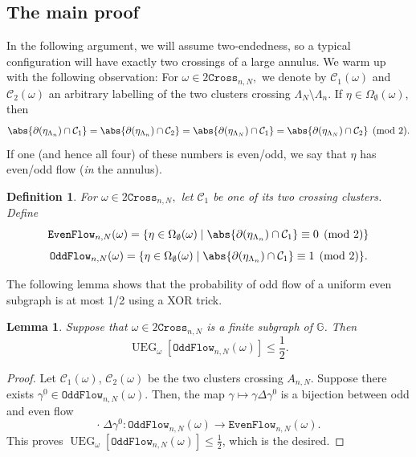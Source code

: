 \documentclass[article,11pt,reqno]{amsart}
\newtheorem{definition}[theorem]{Definition}
\newtheorem{lemma}[theorem]{Lemma}
\begin{document}
\subsection{The main proof}



In the following argument, we will assume two-endedness, so a typical configuration will have exactly two crossings of a large annulus. We warm up with the following observation: For $\omega\in 2\mathtt{Cross}_{n,N},$ we denote by $\mathcal{C}_1(\omega)$ and $\mathcal{C}_2(\omega)$ an arbitrary labelling of the two clusters crossing $\Lambda_N\setminus \Lambda_n.$ If
$\eta \in \Omega_{\emptyset}(\omega)$, then
\begin{align} \label{eq:parity}
    \abs{\partial (\eta_{\Lambda_n})\cap \mathcal{C}_1}=    \abs{\partial (\eta_{\Lambda_n})\cap \mathcal{C}_2}
    =    \abs{\partial (\eta_{\Lambda_N})\cap \mathcal{C}_1}
    =    \abs{\partial (\eta_{\Lambda_N})\cap \mathcal{C}_2} \pmod 2.
\end{align}
If one (and hence all four) of these numbers is even/odd, we say that $\eta$ has even/odd flow (\textit{in} the annulus). 
\begin{definition}
    For $\omega\in 2\mathtt{Cross}_{n,N},$  let $\mathcal{C}_1$ be one of its two crossing clusters. Define 
    $$\mathtt{EvenFlow}_{n,N}(\omega) = \{ \eta \in \Omega_\emptyset(\omega) \mid \abs{\partial (\eta_{\Lambda_n})\cap \mathcal{C}_1} \equiv 0 \pmod{2}  \}$$
     $$\mathtt{OddFlow}_{n,N}(\omega) = \{ \eta \in \Omega_\emptyset(\omega) \mid \abs{\partial (\eta_{\Lambda_n})\cap \mathcal{C}_1} \equiv 1 \pmod{2}  \}.$$
\end{definition}
The following lemma shows that the probability of odd flow of a uniform even subgraph is at most 1/2 using a XOR trick.
\begin{lemma} \label{lemma:source_counting}
    Suppose that $\omega \in 2\mathtt{Cross}_{n,N}$ is a finite subgraph of $\mathbb{G}$.
    Then
    $$
    \operatorname{UEG}_{\omega}[\mathtt{OddFlow}_{n,N}(\omega)] \leq \frac{1}{2}.
    $$
 \end{lemma}


\begin{proof}
 Let $\mathcal{C}_1(\omega)$, $\mathcal{C}_2(\omega)$ be the two clusters crossing $A_{n,N}$. 
Suppose there exists $\gamma^0\in \mathtt{OddFlow}_{n,N}(\omega)$.  Then, the map $\gamma\mapsto \gamma\Delta \gamma^0$ is a bijection between odd and even flow
$$
\cdot \;\Delta \gamma^0: \mathtt{OddFlow}_{n,N}(\omega)\to \mathtt{EvenFlow}_{n,N}(\omega). 
$$
This proves $\operatorname{UEG}_{\omega}[ \mathtt{OddFlow}_{n,N}(\omega)] \leq \frac{1}{2}$, which is the desired. 
\end{proof}
\end{document}
